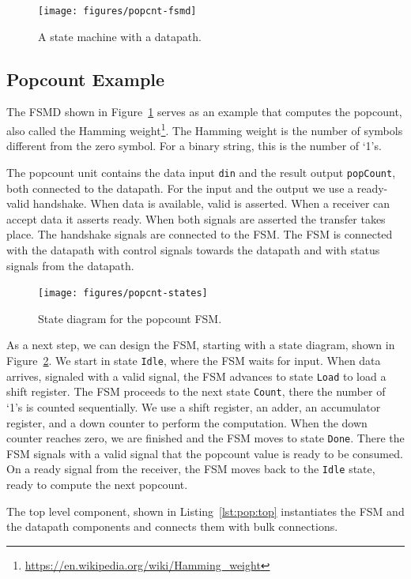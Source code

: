 \documentclass[%
    10pt,
    headinclude, footexclude,
    openright, %
    notitlepage,
    cleardoubleempty,
    headsepline,
    pointlessnumbers,
    bibtotoc, idxtotoc,
    ]{scrbook}
\newcommand{\code}[1]{{\small{\texttt{#1}}}}
\newcommand{\myref}[2]{\href{#1}{#2}}
\renewcommand{\myref}[2]{{#2}{\footnote{\url{#1}}}}
\begin{document}
\begin{figure}
  \centering
  \texttt{[image: figures/popcnt-fsmd]}
  \caption{A state machine with a datapath.}
  \label{fig:popcnt-fsmd}
\end{figure}

\subsection{Popcount Example}

The FSMD shown in Figure~\ref{fig:popcnt-fsmd} serves as an example that computes the
popcount, also called the \myref{https://en.wikipedia.org/wiki/Hamming_weight}{Hamming weight}.
The Hamming weight is the number of symbols different from the zero symbol.
For a binary string, this is the number of `1's.

The popcount unit contains the data input \code{din} and the result output \code{popCount},
both connected to the datapath. For the input and the output we use a ready-valid handshake.
When data is available, valid is asserted. When a receiver can accept data it asserts ready.
When both signals are asserted the transfer takes place. The handshake signals are connected
to the FSM. The FSM is connected with the datapath with control signals towards the datapath
and with status signals from the datapath.

\begin{figure}
  \centering
  \texttt{[image: figures/popcnt-states]}
  \caption{State diagram for the popcount FSM.}
  \label{fig:popcnt-states}
\end{figure}

As a next step, we can design the FSM, starting with a state diagram, shown in
Figure~\ref{fig:popcnt-states}. We start in state \code{Idle}, where the FSM waits
for input. When data arrives, signaled with a valid signal, the FSM advances to state \code{Load}
to load a shift register. The FSM proceeds to the next state \code{Count}, there the number
of `1's is counted sequentially. We use a shift register, an adder, an accumulator
register, and a down counter to perform the computation. When the down counter reaches
zero, we are finished and the FSM moves to state \code{Done}. There the FSM signals with a valid
signal that the popcount value is ready to be consumed. On a ready signal from the
receiver, the FSM moves back to the \code{Idle} state, ready to compute the next popcount.

The top level component, shown in Listing~\ref{lst:pop:top} instantiates the FSM and the datapath components and connects
them with bulk connections.
\end{document}
